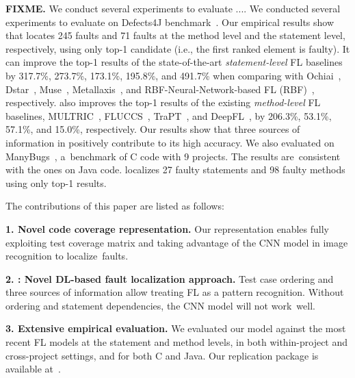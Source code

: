 {\bf FIXME.} We conduct several experiments to evaluate {\tool}....
We conducted several experiments to evaluate {\tool} on Defects4J
benchmark~\cite{defects4j}. Our empirical results show that \tool
locates 245 faults and 71 faults at the method level and the statement
level, respectively, using only top-1 candidate (i.e., the first
ranked element is faulty). It can improve the top-1 results of the
state-of-the-art \textit{statement-level} FL baselines by 317.7\%,
273.7\%, 173.1\%, 195.8\%, and 491.7\% when comparing with
Ochiai~\cite{Ochiai}, Dstar~\cite{DStar}, Muse~\cite{MUSE},
Metallaxis~\cite{Metallaxis}, and RBF-Neural-Network-based FL
(RBF)~\cite{RBF_Neural_Network}, respectively.  {\tool} also improves
the top-1 results of the existing \textit{method-level} FL baselines,
MULTRIC~\cite{MULTRIC}, FLUCCS~\cite{FLUCCS}, TraPT~\cite{TraPT}, and
DeepFL~\cite{DeepFL}, by 206.3\%, 53.1\%, 57.1\%, and 15.0\%,
respectively. Our results show that three sources of information in
{\tool} positively contribute to its high accuracy. We also evaluated
{\tool} on ManyBugs~\cite{LeGoues15tse}, a~ben\-chmark of C code with
9 projects. The results are~consistent with the ones on Java code.
{\tool} localizes 27 faulty statements and 98 faulty methods using
only top-1 results.

The contributions of this paper are listed as follows:

{\bf 1. Novel code coverage representation.} Our representation
enables fully exploiting test coverage matrix and taking advantage of
the CNN model in image recognition to localize~faults.

{\bf 2. {\tool}: Novel DL-based fault localization approach.} Test
case ordering and three sources of information allow treating FL as a
pattern recognition. Without ordering and statement dependencies, the
CNN model will not work~well.

{\bf 3. Extensive empirical evaluation.} We evaluated our model
against the most recent FL models at the statement and method levels,
in both within-project and cross-project settings, and for both C and
Java. Our replication package is available
at~\cite{FaultLocalization2021}.

